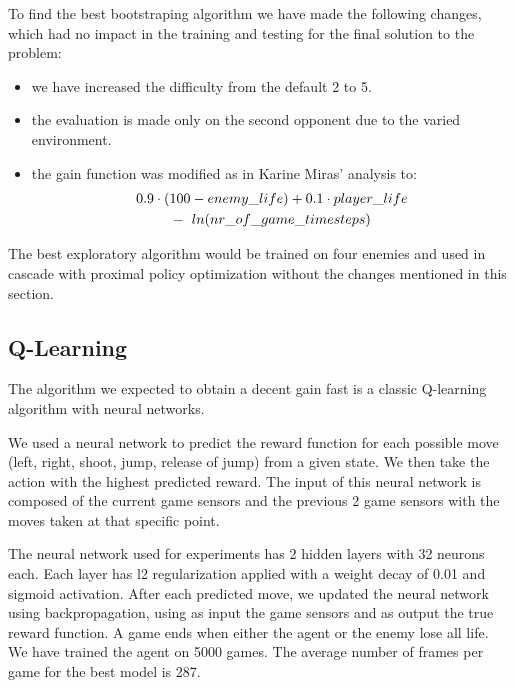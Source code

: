 \documentclass[conference]{IEEEtran}
\begin{document}
    To find the best bootstraping algorithm we have made the following changes, which had no impact in the training and testing for the final solution to the problem:
    \begin{itemize}
        \item we have increased the difficulty from the default 2 to 5.
        \item the evaluation is made only on the second opponent due to the varied environment.
        \item the gain function was modified as in Karine Miras' analysis\cite{evoman_blog} to:
        \boldmath
        \begin{gather*}
            0.9 \cdot (100 - enemy\_life) + 0.1 \cdot player\_life\\
            -\hspace{0.2cm} ln(nr\_of\_game\_timesteps)\\
        \end{gather*}
        \unboldmath
    \end{itemize}

    The best exploratory algorithm would be trained on four enemies and
    used in cascade with proximal policy optimization without the changes mentioned in this section.

    \subsection{Q-Learning}\label{subsec:q-learning}
    The algorithm we expected to obtain a decent gain fast is a classic Q-learning\cite{q_learning} algorithm with neural networks.

    We used a neural network to predict the reward function for each possible move
    (left, right, shoot, jump, release of jump) from a given state.
    We then take the action with the highest predicted reward.
    The input of this neural network is composed of the current game sensors and the
    previous 2 game sensors with the moves taken at that specific point.

    The neural network used for experiments has 2 hidden layers with 32 neurons each.
    Each layer has l2 regularization applied with a weight decay of 0.01 and sigmoid activation.
    After each predicted move, we updated the neural network using backpropagation,
    using as input the game sensors and as output the true reward function.
    A game ends when either the agent or the enemy lose all life.
    We have trained the agent on 5000 games.
    The average number of frames per game for the best model is 287.
\end{document}

